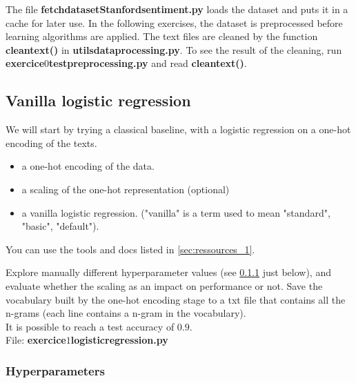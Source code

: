 \documentclass[
10pt, %
a4paper, %
oneside, %
headinclude,footinclude, %
BCOR5mm, %
]{scrartcl}
\begin{document}
The file \textbf{fetch\textunderscore dataset\textunderscore Stanford\textunderscore sentiment.py} loads the dataset and puts it in a cache for later use. In the following exercises, the dataset is preprocessed before learning algorithms are applied. The text files are cleaned by the function \textbf{clean\textunderscore text()} in \textbf{utils\textunderscore data\textunderscore processing.py}. To see the result of the cleaning, run \textbf{exercice\textunderscore $0$\textunderscore test\textunderscore preprocessing.py} and read \textbf{clean\textunderscore text()}.


\subsection{Vanilla logistic regression}
\label{sec:basic}

We will start by trying a classical baseline, with a logistic regression on a one-hot encoding of the texts.

{\color{Purple}{Build a baseline estimator, with a pipeline that will contain the following steps:}}
\begin{itemize}
	\item a one-hot encoding of the data.
	\item a scaling of the one-hot representation (optional)
	\item a vanilla logistic regression. ("vanilla" is a term used to mean "standard", "basic", "default").
\end{itemize}

You can use the tools and docs listed in \ref{sec:ressources_1}.

Explore manually different hyperparameter values (see \ref{sec:hyper_1} just
below), and evaluate whether the scaling as an impact on performance or not.
Save the vocabulary built by the one-hot encoding stage to a txt file that
contains all the n-grams (each line contains a n-gram in the vocabulary).
\\

It is possible to reach a test accuracy of $0.9$.
\\

File: \textbf{exercice\textunderscore $1$\textunderscore logistic\textunderscore regression.py}

\subsubsection{Hyperparameters}
\label{sec:hyper_1}
\end{document}
